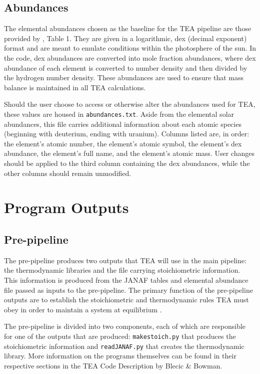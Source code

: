{%
\subsection{Abundances}
\label{AbunSec}
The elemental abundances chosen as the baseline for the TEA pipeline
are those provided by \citet{AsplundEtal2009-SunAbundances}, Table 1.
They are given in a logarithmic, dex (decimal exponent) format and are
meant to emulate conditions within the photosphere of the sun. In the
code, dex abundances are converted into mole fraction abundances,
where dex abundance of each element is converted to number density and
then divided by the hydrogen number density. These abundances are used
to ensure that mass balance is maintained in all TEA calculations.

Should the user choose to access or otherwise alter the abundances
used for TEA, these values are housed in \texttt{abundances.txt}.
Aside from the elemental solar abundances, this file carries
additional information about each atomic species (beginning with
deuterium, ending with uranium).  Columns listed are, in order: the
element's atomic number, the element's atomic symbol, the element's
dex abundance, the element's full name, and the element's atomic mass.
User changes should be applied to the third column containing the dex
abundances, while the other columns should remain unmodified.



\section{Program Outputs}
\subsection{Pre-pipeline}
\label{PrePipe}
  The pre-pipeline produces two outputs that TEA will use in the main
  pipeline: the thermodynamic libraries and the file carrying
  stoichiometric information. This information is produced from the
  JANAF tables and elemental abundance file passed as inputs to the
  pre-pipeline.  The primary function of the pre-pipeline outputs are
  to establish the stoichiometric and thermodynamic rules TEA must
  obey in order to maintain a system at
  equilibrium \citep{BlecicEtal2015-TEAtheory}.
  
  The pre-pipeline is divided into two components, each of which are
  responsible for one of the outputs that are
  produced: \texttt{makestoich.py} that produces the stoichiometric
  information and \texttt{readJANAF.py} that creates the thermodynamic
  library.  More information on the programs themselves can be found
  in their respective sections in the TEA Code Description by
  Blecic \& Bowman.
  
}
